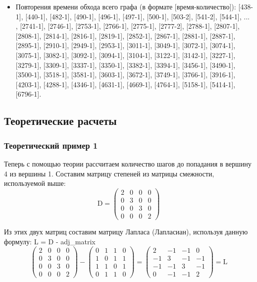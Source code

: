 \documentclass{article}
\begin{document}
\begin{itemize}
    \item Повторения времени обхода всего графа (в формате [время-количество]):
    [438-1], [440-1], [482-1], [490-1], [496-1], [497-1], [500-1], [503-2], [541-2], [544-1], ... , [2741-1], [2746-1], [2753-1], [2766-1], [2775-1], [2777-2], [2788-1], [2807-1], [2808-1], [2814-1], [2816-1], [2819-1], [2852-1], [2867-1], [2881-1], [2887-1], [2895-1], [2910-1], [2949-1], [2953-1], [3011-1], [3049-1], [3072-1], [3074-1], [3075-1], [3082-1], [3092-1], [3094-1], [3104-1], [3122-1], [3142-1], [3227-1], [3279-1], [3309-1], [3337-1], [3350-1], [3382-1], [3394-1], [3456-1], [3490-1], [3500-1], [3518-1], [3581-1], [3603-1], [3672-1], [3749-1], [3766-1], [3916-1], [4203-1], [4288-1], [4346-1], [4631-1], [4669-1], [4764-1], [5158-1], [5414-1], [6796-1].
\end{itemize}

\subsection{Теоретические расчеты}
\subsubsection{Теоретический пример 1}
Теперь с помощью теории рассчитаем количество шагов до попадания в вершину 4 из вершины 1. Составим матрицу степеней из матрицы смежности, используемой выше:
\[
\text{D} = \begin{pmatrix}
2 & 0 & 0 & 0 \\ 
0 & 3 & 0 & 0 \\ 
0 & 0 & 3 & 0 \\
0 & 0 & 0 & 2 
\end{pmatrix}
\]

Из этих двух матриц составим матрицу Лапласа (Лапласиан), используя данную формулу: {L = D - adj_matrix}
\[
\begin{pmatrix}
2 & 0 & 0 & 0 \\ 
0 & 3 & 0 & 0 \\ 
0 & 0 & 3 & 0 \\
0 & 0 & 0 & 2 
\end{pmatrix}
-
\begin{pmatrix}
0 & 1 & 1 & 0 \\ 
1 & 0 & 1 & 1 \\ 
1 & 1 & 0 & 1 \\
0 & 1 & 1 & 0 
\end{pmatrix}
=
 \begin{pmatrix} 
2 & -1 & -1 & 0 \\ 
-1 & 3 & -1 & -1 \\ 
-1 & -1 & 3 & -1 \\
0 & -1 & -1 & 2 
\end{pmatrix} = \text{L}
\]
\end{document}
